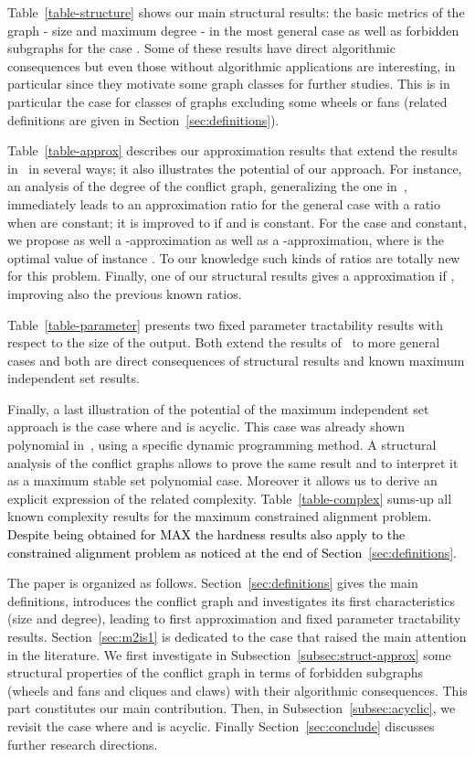 \documentclass[final]{dmtcs-episciences}
\newcommand\mar[1]{\textcolor{black}{#1}}
\begin{document}
Table~\ref{table-structure} shows our main structural results: the basic metrics of the graph \-- size and maximum degree \-- in the most general case as well as forbidden subgraphs for the case . Some of these results have direct algorithmic consequences but even those without algorithmic applications are interesting, in particular since they motivate some graph classes for further studies. This is in particular the case for classes of graphs excluding some wheels or fans (related definitions are given in Section~\ref{sec:definitions}).

Table~\ref{table-approx} describes our approximation results that
extend the results in~\citet{Fertin200990} in several ways; it also illustrates  the potential of our approach. For instance,  an analysis of the degree of the conflict graph, generalizing the one in~\citet{Fertin200990},  immediately leads to an approximation ratio for the  general case  with a ratio  when  are constant; it is improved to  if  and  is constant. For the case  and  constant, we propose as well a -approximation as well as a -approximation, where  is the optimal value of instance . To our knowledge such kinds of ratios are totally new for this problem. Finally, one of our structural results gives a  approximation if , improving also the previous known ratios. 

Table~\ref{table-parameter} presents two fixed parameter tractability results with respect to the size of the output. Both extend the results of~\citet{Fertin200990} to more general cases and both are direct consequences of structural results and known maximum independent set results. 

Finally, a last illustration of the potential of the maximum independent set approach is the case where  and  is acyclic. This case was already shown polynomial in~\citet{AbakaBE13}, using a specific dynamic programming method. A structural analysis of the conflict graphs allows to prove the same result and to interpret it as a maximum stable set polynomial case. Moreover it allows us to derive an explicit expression of the related complexity. Table~\ref{table-complex} sums-up all known complexity results for the maximum constrained alignment problem. \mar{Despite being obtained for {MAX} the hardness results also apply to the constrained alignment problem as noticed at the end of Section~\ref{sec:definitions}}.


 
 The paper is organized as follows. Section~\ref{sec:definitions} gives the main definitions, introduces the conflict graph and investigates its first characteristics (size and degree), leading  to first approximation and fixed parameter tractability results.
 Section~\ref{sec:m2is1} is dedicated to the case  that raised the main attention in the literature.
 We first investigate in Subsection~\ref{subsec:struct-approx} some structural properties   of the conflict graph in terms of forbidden subgraphs (wheels and fans and cliques and claws) with their algorithmic consequences. This part constitutes our main contribution. Then, in Subsection~\ref{subsec:acyclic}, we revisit the case where  and  is acyclic. Finally Section~\ref{sec:conclude}  discusses further research directions.
 
\end{document}

